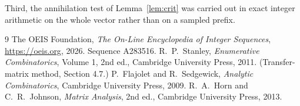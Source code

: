 \documentclass[11pt,a4paper]{article}
\theoremstyle{plain}
\theoremstyle{definition}
\begin{document}
Third, the annihilation test of Lemma~\ref{lem:crit} was carried out in exact integer
arithmetic on the whole vector rather than on a sampled prefix.

\begin{thebibliography}{9}
 The OEIS Foundation, \emph{The On-Line Encyclopedia of Integer
Sequences}, \url{https://oeis.org}, 2026. Sequence A283516.
 R.~P.~Stanley, \emph{Enumerative Combinatorics}, Volume 1, 2nd ed.,
Cambridge University Press, 2011. (Transfer-matrix method, Section 4.7.)
 P.~Flajolet and R.~Sedgewick, \emph{Analytic Combinatorics}, Cambridge
University Press, 2009.
 R.~A.~Horn and C.~R.~Johnson, \emph{Matrix Analysis}, 2nd ed., Cambridge
University Press, 2013.
\end{thebibliography}
\end{document}
